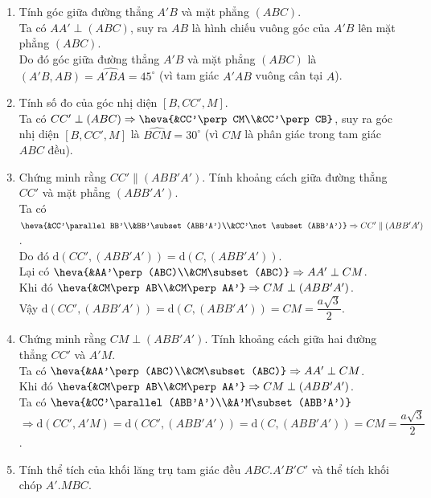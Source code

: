 \begin{bt}
\begin{bt}
{\begin{enumerate}
	Ta có $B'C'\parallel BC$, suy ra $(AB,B'C')=(AB,BC)=\widehat{ABC}=60^\circ$ (vì tam giác $ABC$ đều).
	\item Tính góc giữa đường thẳng $A'B$ và mặt phẳng $(ABC)$.\\
	Ta có $AA'\perp (ABC)$, suy ra $AB$ là hình chiếu vuông góc của $A'B$ lên mặt phẳng $(ABC)$.\\
	Do đó góc giữa đường thẳng $A'B$ và mặt phẳng $(ABC)$ là $(A'B,AB)=\widehat{A'BA}=45^\circ$ (vì tam giác $A'AB$ vuông cân tại $A$).
	\item Tính số đo của góc nhị diện $[B,CC',M]$.\\
	Ta có $CC'\perp (ABC)\Rightarrow \heva{&CC'\perp CM\\&CC'\perp CB}$, suy ra góc nhị diện $[B,CC',M]$ là $\widehat{BCM}=30^\circ$ (vì $CM$ là phân giác trong tam giác $ABC$ đều).
	\item Chứng minh rằng $CC'\parallel (ABB'A')$. Tính khoảng cách giữa đường thẳng $CC'$ và mặt phẳng $(ABB'A')$.\\
	Ta có $\heva{&CC'\parallel BB'\\&BB'\subset (ABB'A')\\&CC'\not\subset (ABB'A')}\Rightarrow CC'\parallel (ABB'A')$.\\ Do đó $\mathrm{d}(CC',(ABB'A'))=\mathrm{d}(C,(ABB'A'))$.\\
	Lại có $\heva{&AA'\perp (ABC)\\&CM\subset (ABC)}\Rightarrow AA'\perp CM$.\\
	Khi đó $\heva{&CM\perp AB\\&CM\perp AA'}\Rightarrow CM\perp (ABB'A')$.\\
	Vậy $\mathrm{d}(CC',(ABB'A'))=\mathrm{d}(C,(ABB'A'))=CM=\dfrac{a\sqrt{3}}{2}$.
	\item Chứng minh rằng $CM\perp (ABB'A')$. Tính khoảng cách giữa hai đường thẳng $CC'$ và $A'M$.\\
	Ta có $\heva{&AA'\perp (ABC)\\&CM\subset (ABC)}\Rightarrow AA'\perp CM$.\\
	Khi đó $\heva{&CM\perp AB\\&CM\perp AA'}\Rightarrow CM\perp (ABB'A')$.\\
	Ta có $\heva{&CC'\parallel (ABB'A')\\&A'M\subset (ABB'A')}$\\
	$\Rightarrow \mathrm{d}(CC',A'M)=\mathrm{d}(CC',(ABB'A'))=\mathrm{d}(C,(ABB'A'))=CM=\dfrac{a\sqrt{3}}{2}$.
	\item Tính thể tích của khối lăng trụ tam giác đều $ABC.A'B'C'$ và thể tích khối chóp $A'.MBC$.\\

\end{enumerate}}
\end{bt}
\end{bt}
